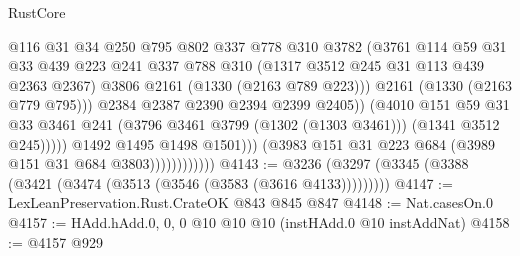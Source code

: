 \begin{lexlean}{RustCore}
\begin{coremodule}
                                          @116
                                          @31
                                          @34
                                          @250
                                          @795
                                          @802
                                          @337
                                          @778
                                          @310
                                          @3782
                                          (@3761
                                            @114
                                            @59
                                            @31
                                            @33
                                            @439
                                            @223
                                            @241
                                            @337
                                            @788
                                            @310
                                            (@1317 @3512 @245 @31 @113 @439 @2363 @2367)
                                            @3806
                                            @2161
                                            (@1330 (@2163 @789 @223)))
                                          @2161
                                          (@1330 (@2163 @779 @795)))
                                        @2384
                                        @2387
                                        @2390
                                        @2394
                                        @2399
                                        @2405))
                                    (@4010
                                      @151
                                      @59
                                      @31
                                      @33
                                      @3461
                                      @241
                                      (@3796 @3461 @3799 (@1302 (@1303 @3461)))
                                      (@1341 @3512 @245)))))
                              @1492
                              @1495
                              @1498
                              @1501)))
                        (@3983 @151 @31 @223 @684 (@3989 @151 @31 @684 @3803))))))))))))
@4143 := @3236 (@3297 (@3345 (@3388 (@3421 (@3474 (@3513 (@3546 (@3583 (@3616 @4133)))))))))
@4147 := LexLeanPreservation.Rust.CrateOK @843 @845 @847
@4148 := Nat.casesOn.{0}
@4157 := HAdd.hAdd.{0, 0, 0} @10 @10 @10 (instHAdd.{0} @10 instAddNat)
@4158 := @4157 @929

\end{coremodule}
\end{lexlean}
